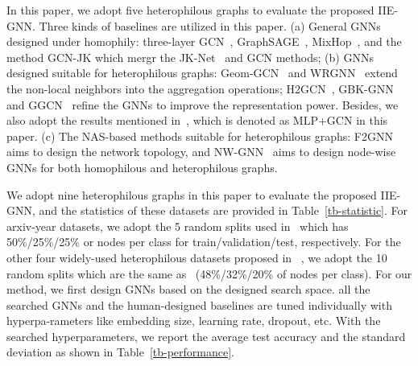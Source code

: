 \documentclass[sigconf]{acmart}
\begin{document}
In this paper, we adopt five heterophilous graphs to evaluate the proposed IIE-GNN.
Three kinds of baselines are utilized in this paper. 
(a) General GNNs designed under homophily: three-layer GCN~\cite{kipf2016semi}, GraphSAGE~\cite{hamilton2017inductive}, MixHop~\cite{abu2019mixhop}, and the method GCN-JK which mergr the JK-Net~\cite{xu2018representation} and GCN methods;
(b)  GNNs designed suitable for heterophilous graphs: Geom-GCN~\cite{pei2020geom} and WRGNN~\cite{suresh2021breaking} extend the non-local neighbors into the aggregation operations; H2GCN~\cite{zhu2020beyond}, GBK-GNN~\cite{du2022gbk} and GGCN~\cite{yan2021two} refine the GNNs to improve the representation power. Besides, we also adopt the results mentioned in~\cite{ma2021homophily}, which is denoted as MLP+GCN in this paper.
(c) The NAS-based methods suitable for heterophilous graphs: F2GNN~\cite{wei2022designing} aims to design the network topology, and NW-GNN~\cite{wang2022graph} aims to design node-wise GNNs for both homophilous and heterophilous graphs. 


We adopt nine heterophilous graphs in this paper to evaluate the proposed IIE-GNN, and the statistics of these datasets are provided in Table~\ref{tb-statistic}. 
For arxiv-year datasets, we adopt the 5 random splits used in~\cite{lim2021new} which has 50\%/25\%/25\% or nodes per class for train/validation/test, respectively. For the other four widely-used heterophilous datasets proposed in ~\cite{pei2020geom,zhu2020beyond}, we adopt the 10 random splits which are the same as~\cite{pei2020geom} (48\%/32\%/20\% of nodes per class).
For our method, we first design GNNs based on the designed search space. all the searched GNNs and the human-designed baselines are tuned individually with hyperpa-rameters like embedding size, learning rate, dropout, etc. With the searched hyperparameters, we report the average test accuracy and the standard deviation as shown in Table~\ref{tb-performance}.
\end{document}
